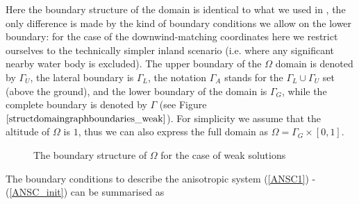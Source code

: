 \documentclass[11pt, a4paper]{article}
\begin{document}
Here the boundary structure of the domain is identical to what we used in \cite{pollatmws2019}, the only difference is made by the kind of boundary conditions we allow on the lower boundary: for the case of the downwind-matching coordinates here we restrict ourselves to the technically simpler inland scenario (i.e. where any significant nearby water body is excluded). The upper boundary of the $\Omega$ domain is denoted by $\Gamma_U$, the lateral boundary is $\Gamma_L$, the notation $\Gamma_A$ stands for the $\Gamma_L \cup \Gamma_U$ set (above the ground), and the lower boundary of the domain is $\Gamma_G$, while the complete boundary is denoted by $\Gamma$ (see Figure $\ref{structdomaingraphboundaries_weak}$). For simplicity we assume that the altitude of $\Omega$ is $1$, thus we can also express the full domain as $\Omega = \Gamma_G \times [0,1]$.
\begin{figure}[!h]
\centering
{}
\caption{The boundary structure of $\Omega$ for the case of weak solutions}
\label{structdomaingraphboundaries_weak}
\end{figure}

The boundary conditions to describe the anisotropic system (\ref{ANSC1}) - (\ref{ANSC_init}) can be summarised as
\end{document}
